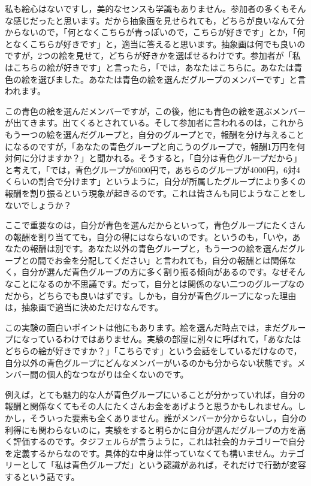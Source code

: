 \documentclass{ltjsbook}
\begin{document}
私も絵心はないですし，美的なセンスも学識もありません。参加者の多くもそんな感じだったと思います。だから抽象画を見せられても，どちらが良いなんて分からないので，「何となくこちらが青っぽいので，こちらが好きです」とか，「何となくこちらが好きです」と，適当に答えると思います。抽象画は何でも良いのですが，2つの絵を見せて，どちらが好きかを選ばせるわけです。参加者が「私はこちらの絵が好きです」と言ったら，「では，あなたはこちらに。あなたは青色の絵を選びました。あなたは青色の絵を選んだグループのメンバーです」と言われます。

この青色の絵を選んだメンバーですが，この後，他にも青色の絵を選ぶメンバーが出てきます。出てくるとされている。そして参加者に言われるのは，これからもう一つの絵を選んだグループと，自分のグループとで，報酬を分け与えることになるのですが，「あなたの青色グループと向こうのグループで，報酬1万円を何対何に分けますか？」と聞かれる。そうすると，「自分は青色グループだから」と考えて，「では，青色グループが6000円で，あちらのグループが4000円，6対4くらいの割合で分けます」というように，自分が所属したグループにより多くの報酬を割り振るという現象が起きるのです。これは皆さんも同じようなことをしないでしょうか？

ここで重要なのは，自分が青色を選んだからといって，青色グループにたくさんの報酬を割り当てても，自分の得にはならないのです。というのも，「いや，あなたの報酬は別です。あなた以外の青色グループと，もう一つの絵を選んだグループとの間でお金を分配してください」と言われても，自分の報酬とは関係なく，自分が選んだ青色グループの方に多く割り振る傾向があるのです。なぜそんなことになるのか不思議です。だって，自分とは関係のない二つのグループなのだから，どちらでも良いはずです。しかも，自分が青色グループになった理由は，抽象画で適当に決めただけなんです。

この実験の面白いポイントは他にもあります。絵を選んだ時点では，まだグループになっているわけではありません。実験の部屋に別々に呼ばれて，「あなたはどちらの絵が好きですか？」「こちらです」という会話をしているだけなので，自分以外の青色グループにどんなメンバーがいるのかも分からない状態です。メンバー間の個人的なつながりは全くないのです。

例えば，とても魅力的な人が青色グループにいることが分かっていれば，自分の報酬と関係なくてもその人にたくさんお金をあげようと思うかもしれません。しかし，そういった要素も全くありません。誰がメンバーか分からないし，自分の利得にも関わらないのに，実験をすると明らかに自分が選んだグループの方を高く評価するのです。タジフェルらが言うように，これは社会的カテゴリーで自分を定義するからなのです。具体的な中身は伴っていなくても構いません。カテゴリーとして「私は青色グループだ」という認識があれば，それだけで行動が変容するという話です。
\end{document}
